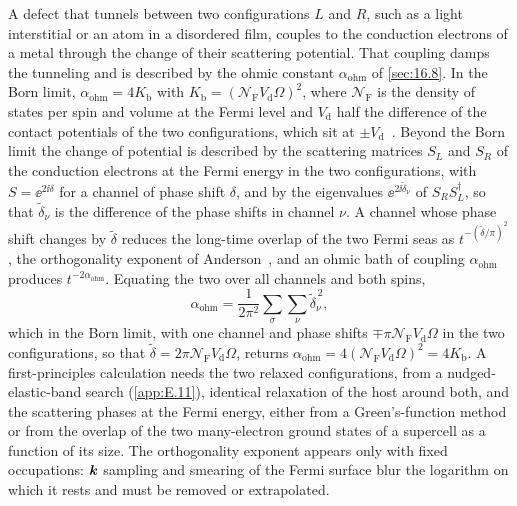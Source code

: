 A defect that tunnels between two configurations $L$ and $R$, such as a light interstitial or an atom in a disordered film, couples to the conduction electrons of a metal through the change of their scattering potential. That coupling damps the tunneling and is described by the ohmic constant $\alpha_{\mathrm{ohm}}$ of \cref{sec:16.8}. In the Born limit, $\alpha_{\mathrm{ohm}} = 4K_{\mathrm{b}}$ with $K_{\mathrm{b}} = (\mathcal{N}_{\mathrm{F}}V_{\mathrm{d}}\Omega)^2$, where $\mathcal{N}_{\mathrm{F}}$ is the density of states per spin and volume at the Fermi level and $V_{\mathrm{d}}$ half the difference of the contact potentials of the two configurations, which sit at $\pm V_{\mathrm{d}}$~\cite[Eq.~(4)]{maillet2023nanomechanical}. Beyond the Born limit the change of potential is described by the scattering matrices $S_L$ and $S_R$ of the conduction electrons at the Fermi energy in the two configurations, with $S = \ee^{2\ii\delta}$ for a channel of phase shift $\delta$, and by the eigenvalues $\ee^{2\ii\tilde\delta_\nu}$ of $S_RS_L^\dagger$, so that $\tilde\delta_\nu$ is the difference of the phase shifts in channel $\nu$. A channel whose phase shift changes by $\tilde\delta$ reduces the long-time overlap of the two Fermi seas as $t^{-(\tilde\delta/\pi)^2}$, the orthogonality exponent of Anderson~\cite{anderson1967infrared}, and an ohmic bath of coupling $\alpha_{\mathrm{ohm}}$ produces $t^{-2\alpha_{\mathrm{ohm}}}$. Equating the two over all channels and both spins,
\begin{equation}
  \alpha_{\mathrm{ohm}} = \frac{1}{2\pi^2}\sum_\sigma\sum_\nu\tilde\delta_\nu^{\,2} ,
  \label{eq:E.10-ohm}
\end{equation}
which in the Born limit, with one channel and phase shifts $\mp\pi\mathcal{N}_{\mathrm{F}}V_{\mathrm{d}}\Omega$ in the two configurations, so that $\tilde\delta = 2\pi\mathcal{N}_{\mathrm{F}}V_{\mathrm{d}}\Omega$, returns $\alpha_{\mathrm{ohm}} = 4(\mathcal{N}_{\mathrm{F}}V_{\mathrm{d}}\Omega)^2 = 4K_{\mathrm{b}}$. A first-principles calculation needs the two relaxed configurations, from a nudged-elastic-band search (\cref{app:E.11}), identical relaxation of the host around both, and the scattering phases at the Fermi energy, either from a Green's-function method or from the overlap of the two many-electron ground states of a supercell as a function of its size. The orthogonality exponent appears only with fixed occupations: $\bm{k}$ sampling and smearing of the Fermi surface blur the logarithm on which it rests and must be removed or extrapolated.


